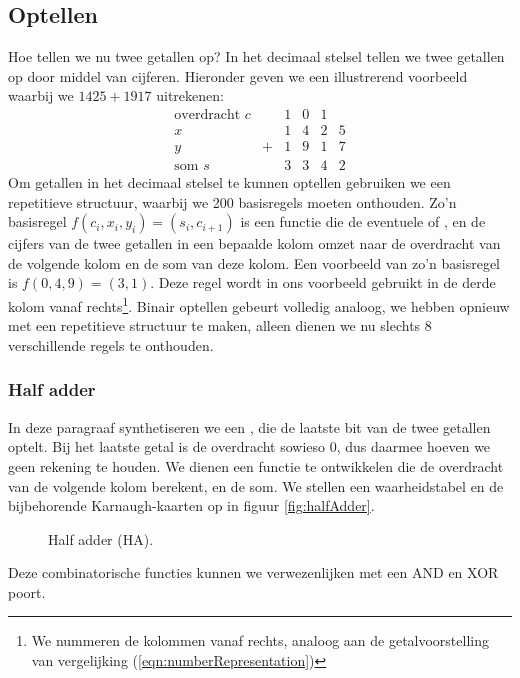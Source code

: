 \subsection{Optellen}
\label{ss:add}
Hoe tellen we nu twee getallen op? In het decimaal stelsel tellen we twee getallen op door middel van cijferen. Hieronder geven we een illustrerend voorbeeld waarbij we $1425+1917$ uitrekenen:
\begin{equation}
\begin{array}{l|lcccc}
\mbox{overdracht $c$}&&1&0&1&\\
x&&1&4&2&5\\
y&+&1&9&1&7\\\hline
\mbox{som $s$}&&3&3&4&2
\end{array}
\end{equation}
Om getallen in het decimaal stelsel te kunnen optellen gebruiken we een repetitieve structuur, waarbij we 200 basisregels moeten onthouden. Zo'n basisregel $f\left(c_i,x_i,y_i\right)=\left(s_i,c_{i+1}\right)$ is een functie die de eventuele  of , en de cijfers van de twee getallen in een bepaalde kolom omzet naar de overdracht van de volgende kolom en de som van deze kolom. Een voorbeeld van zo'n basisregel is $f\left(0,4,9\right)=\left(3,1\right)$. Deze regel wordt in ons voorbeeld gebruikt in de derde kolom vanaf rechts\footnote{We nummeren de kolommen vanaf rechts, analoog aan de getalvoorstelling van vergelijking (\ref{eqn:numberRepresentation})}. Binair optellen gebeurt volledig analoog, we hebben opnieuw met een repetitieve structuur te maken, alleen dienen we nu slechts 8 verschillende regels te onthouden.
\subsubsection{Half adder}
In deze paragraaf synthetiseren we een , die de laatste bit van de twee getallen optelt. Bij het laatste getal is de overdracht sowieso 0, dus daarmee hoeven we geen rekening te houden. We dienen een functie te ontwikkelen die de overdracht van de volgende kolom berekent, en de som. We stellen een waarheidstabel en de bijbehorende Karnaugh-kaarten op in figuur \ref{fig:halfAdder}.
\begin{figure}[hbt]
\centering
{}
\caption{Half adder (HA).}
\end{figure}
Deze combinatorische functies kunnen we verwezenlijken met een AND en XOR poort.
